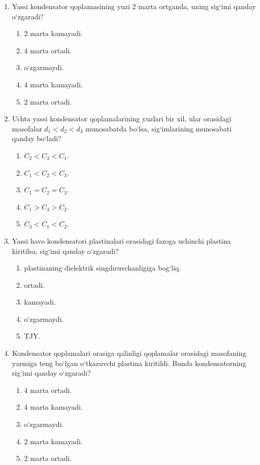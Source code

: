 \begin{enumerate}
\item Yassi kondensator qoplamasining yuzi 2 marta ortganda, uning sig‘imi qanday o‘zgaradi?
\begin{enumerate}[label=\Alph*)]
\item 2 marta kamayadi.
\item 4 marta ortadi.
\item o‘zgarmaydi.
\item 4 marta kamayadi.
\item 2 marta ortadi.
\end{enumerate}

\item Uchta yassi kondensator qoplamalarining yuzlari bir xil, ular orasidagi masofalar $d_1<d_2<d_3$ munosabatda bo‘lsa, sig‘imlarining munosabati qanday bo‘ladi?
\begin{enumerate}[label=\Alph*)]
\item $C_2<C_3<C_1$.
\item $C_1<C_2<C_3$.
\item $C_1=C_2=C_3$.
\item $C_1>C_3>C_2$.
\item $C_3<C_1<C_2$.
\end{enumerate}

\item Yassi havo kondensatori plastinalari orasidagi fazoga uchinchi plastina kiritilsa, sig‘imi qanday o‘zgaradi?
\begin{enumerate}[label=\Alph*)]
\item plastinaning dielektrik singdiruvchanligiga bog‘liq.
\item ortadi.
\item kamayadi.
\item o‘zgarmaydi.
\item TJY.
\end{enumerate}

\item Kondensator qoplamalari orasiga qalinligi qoplamalar orasidagi masofaning yarmiga teng bo‘lgan o‘tkazuvchi plastina kiritildi. Bunda kondensatorning sig‘imi qanday o‘zgaradi?
\begin{enumerate}[label=\Alph*)]
\item 4 marta ortadi.
\item 4 marta kamayadi.
\item o‘zgarmaydi.
\item 2 marta kamayadi.
\item 2 marta ortadi.
\end{enumerate}


\end{enumerate}
